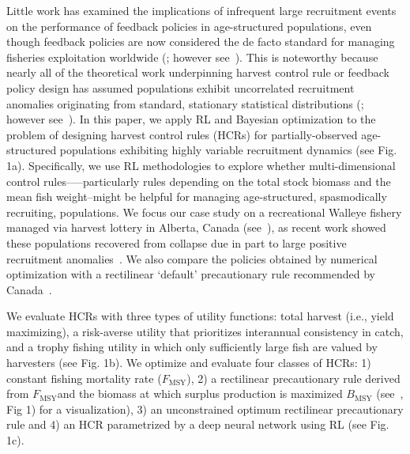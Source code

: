 \documentclass[floatfix,nofootinbib,longbibliography,notitlepage]{revtex4-2}
\def\textfmsy{$F_{\text{MSY}}$}
\def\bmsy{B_{\text{MSY}}}
\def\ie{i.e.}
\begin{document}
Little work has examined the implications of infrequent large recruitment events on the performance of feedback policies in age-structured populations, even though feedback policies are now considered the de facto standard for managing fisheries exploitation worldwide (\cite{silvar-viladomiu,free-etal-2023}; however see~\cite{licandeo-etal-2020}).
This is noteworthy because nearly all of the theoretical work underpinning harvest control rule or feedback policy design has assumed populations exhibit uncorrelated recruitment anomalies originating from standard, stationary statistical distributions (\cite{walters1975optimal,walters-hilborn-1978,reed1979optimal}; however see~\cite{parma1990experimental,hawkshaw2015harvest}). 
In this paper, we apply RL and Bayesian optimization to the problem of designing harvest control rules (HCRs) for partially-observed age-structured populations exhibiting highly variable recruitment dynamics (see Fig. 1a).  
Specifically, we use RL methodologies to explore whether multi-dimensional control rules--—particularly rules depending on the total stock biomass and the mean fish weight--might be helpful for managing age-structured, spasmodically recruiting, populations. 
We focus our case study on a recreational Walleye fishery managed via harvest lottery in Alberta, Canada (see~\cite{sullivan2003}), as recent work showed these populations recovered from collapse due in part to large positive recruitment anomalies~\cite{post-etal-2002,cahill2022}. 
We also compare the policies obtained by numerical optimization with a rectilinear ‘default’ precautionary rule recommended by Canada~\cite{dfo2006}.  

We evaluate HCRs with three types of utility functions: total harvest (\ie, yield maximizing), a risk-averse utility that prioritizes interannual consistency in catch, and a trophy fishing utility in which only sufficiently large fish are valued by harvesters (see Fig. 1b). 
We optimize and evaluate four classes of HCRs: 1) constant fishing mortality rate (\textfmsy), 2) a rectilinear precautionary rule derived from \textfmsy and the biomass at which surplus production is maximized $\bmsy$ (see~\cite{dfo2006}, Fig 1) for a visualization), 3) an unconstrained optimum rectilinear precautionary rule and 4) an HCR parametrized by a deep neural network using RL (see Fig. 1c).
\end{document}
